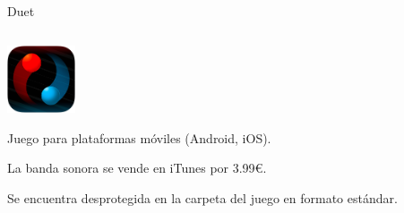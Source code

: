 \begin{frame}{Duet}
\begin{columns}
    \begin{column}{0.75\textwidth}
    \begin{center}\includegraphics[width=0.15\textwidth,keepaspectratio]{imgs/duet_logo.png}\end{center}

    \begin{wideitemize}
        \item<1-> Juego para plataformas móviles (Android, iOS).

        \item<2-> La banda sonora se vende en iTunes por 3.99€.

        \item<3-> Se encuentra desprotegida en la carpeta del juego en formato estándar.
    \end{wideitemize}
    \end{column}


\end{columns}
\end{frame}
